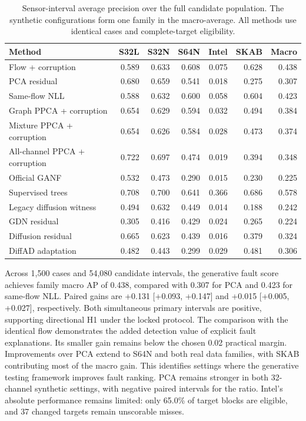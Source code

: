 \documentclass[conference]{IEEEtran}
\newcommand{\1}{\mathbf{1}}
\begin{document}
\begin{table}[t]
\centering
\caption{Sensor-interval average precision over the full candidate population. The synthetic configurations form one family in the macro-average. All methods use identical cases and complete-target eligibility.}
\label{tab:ap}
\small
\begin{tabular}{lrrrrrr}
\toprule
Method & S32L & S32N & S64N & Intel & SKAB & Macro \\
\midrule
Flow + corruption & 0.589 & 0.633 & 0.608 & 0.075 & 0.628 & 0.438 \\
PCA residual & 0.680 & 0.659 & 0.541 & 0.018 & 0.275 & 0.307 \\
Same-flow NLL & 0.588 & 0.632 & 0.600 & 0.058 & 0.604 & 0.423 \\
Graph PPCA + corruption & 0.654 & 0.629 & 0.594 & 0.032 & 0.494 & 0.384 \\
Mixture PPCA + corruption & 0.654 & 0.626 & 0.584 & 0.028 & 0.473 & 0.374 \\
All-channel PPCA + corruption & 0.722 & 0.697 & 0.474 & 0.019 & 0.394 & 0.348 \\
Official GANF & 0.532 & 0.473 & 0.290 & 0.015 & 0.230 & 0.225 \\
Supervised trees & 0.708 & 0.700 & 0.641 & 0.366 & 0.686 & 0.578 \\
Legacy diffusion witness & 0.494 & 0.632 & 0.449 & 0.014 & 0.188 & 0.242 \\
GDN residual & 0.305 & 0.416 & 0.429 & 0.024 & 0.265 & 0.224 \\
Diffusion residual & 0.665 & 0.623 & 0.439 & 0.016 & 0.379 & 0.324 \\
DiffAD adaptation & 0.482 & 0.443 & 0.299 & 0.029 & 0.481 & 0.306 \\
\bottomrule
\end{tabular}
\end{table}
Across 1,500 cases and 54,080 candidate intervals, the generative fault score achieves family macro AP of 0.438, compared with 0.307 for PCA and 0.423 for same-flow NLL. Paired gains are +0.131 [+0.093, +0.147] and +0.015 [+0.005, +0.027], respectively. Both simultaneous primary intervals are positive, supporting directional H1 under the locked protocol. The comparison with the identical flow demonstrates the added detection value of explicit fault explanations. Its smaller gain remains below the chosen 0.02 practical margin.
Improvements over PCA extend to S64N and both real data families, with SKAB contributing most of the macro gain. This identifies settings where the generative testing framework improves fault ranking. PCA remains stronger in both 32-channel synthetic settings, with negative paired intervals for the ratio. Intel's absolute performance remains limited: only 65.0\% of target blocks are eligible, and 37 changed targets remain unscorable misses.
\end{document}
